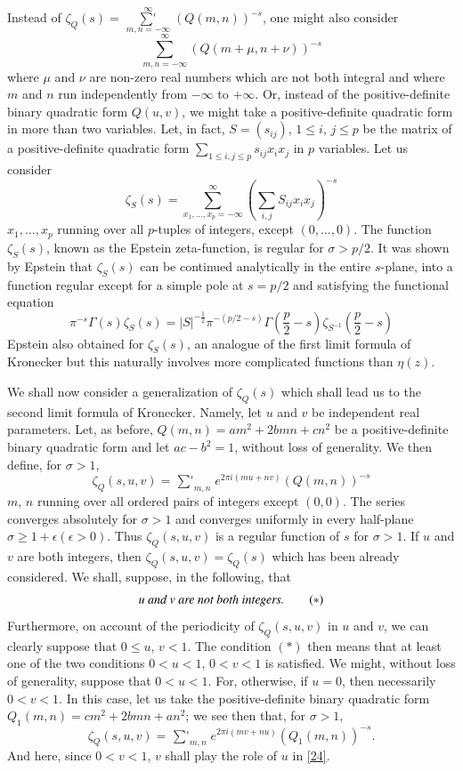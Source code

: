 Instead of
$\zeta_{Q}(s)=\mathop{{\sum}'}\limits^{\infty}_{m,n=-\infty}(Q(m,n))^{-s}$,
one might also consider
$$
\sum^{\infty}_{m,n=-\infty}(Q(m+\mu,n+\nu))^{-s}
$$
where $\mu$ and $\nu$ are non-zero real numbers which are not both
integral and where $m$ and $n$ run independently from $-\infty$ to
$+\infty$. Or, instead of the positive-definite binary quadratic form
$Q(u,v)$, we might take a positive-definite quadratic form in more
than two variables. Let, in fact, $S=(s_{ij})$, $1\leq i$, $j\leq p$
be the matrix of a positive-definite quadratic form
$\sum\limits_{1\leq i,j\leq p}s_{ij}x_{i}x_{j}$ in $p$ variables. Let
us consider
$$
\zeta_{S}(s) = \sum^{\infty}_{x_{1},\ldots,x_{p} =
  -\infty}\left(\sum_{i,j}S_{ij}x_{i}x_{j}\right)^{-s}  
$$
$x_{1},\ldots,x_{p}$ running over all $p$-tuples of integers, except
$(0,\ldots,0)$. The function\pageoriginale $\zeta_{S}(s)$, known as
the Epstein zeta-function, is regular for $\sigma > p/2$. It was shown
by Epstein that $\zeta_{S}(s)$ can be continued analytically in the
entire $s$-plane, into a function regular except for a simple pole at
$s=p/2$ and satisfying the functional equation
$$
\pi^{-s}\Gamma(s)\zeta_{S}(s)=|S|^{-\frac{1}{2}}\pi^{-(p/2-s)}\Gamma\left(\frac{p}{2}-s\right)\zeta_{S^{-1}}\left(\frac{p}{2}-s\right)  
$$
Epstein also obtained for $\zeta_{S}(s)$, an analogue of the first
limit formula of Kronecker but this naturally involves more
complicated functions than $\eta(z)$.

We shall now consider a generalization of $\zeta_{Q}(s)$ which shall
lead us to the second limit formula of Kronecker. Namely, let $u$ and
$v$ be independent real parameters. Let, as before,
$Q(m,n)=am^{2}+2bmn+cn^{2}$ be a positive-definite binary quadratic
form and let $ac-b^{2}=1$, without loss of generality. We then define,
for $\sigma>1$,
\begin{equation*}
\zeta_{Q}(s,u,v)=\mathop{{\sum}'}_{m,n}e^{2\pi
  i(mu+nv)}(Q(m,n))^{-s}\tag{24}\label{24} 
\end{equation*}
$m$, $n$ running over all ordered pairs of integers except
$(0,0)$. The series converges absolutely for $\sigma>1$ and converges
uniformly in every half-plane $\sigma\geq
1+\epsilon(\epsilon>0)$. Thus $\zeta_{Q}(s,u,v)$ is a regular function
of $s$ for $\sigma>1$. If $u$ and $v$ are both integers, then
$\zeta_{Q}(s,u,v)=\zeta_{Q}(s)$ which has been already considered. We
shall, suppose, in the following, that
\begin{equation*}
u \text{ {\em and} } v \text{ {\em are not both integers.}}\tag{$\ast$}
\end{equation*}
Furthermore, on account of the periodicity of $\zeta_{Q}(s,u,v)$ in
$u$ and $v$, we can clearly suppose that $0\leq u$, $v<1$. The
condition $(\ast)$ then means that at least one of the two conditions
$0<u<1$, $0<v<1$ is satisfied. We might, without loss of generality,
suppose that $0<u<1$. For, otherwise, if $u=0$, then necessarily
$0<v<1$. In this case, let us take the positive-definite binary
quadratic form $Q_{1}(m,n)=cm^{2}+2bmn+an^{2}$; we see then that, for
$\sigma>1$, 
$$
\zeta_{Q}(s,u,v)=\mathop{{\sum}'}_{m,n}e^{2\pi 
  i(mv+nu)}(Q_{1}(m,n))^{-s}.
$$
And here, since $0<v<1$, $v$ shall play the role of $u$ in
\eqref{24}. 

